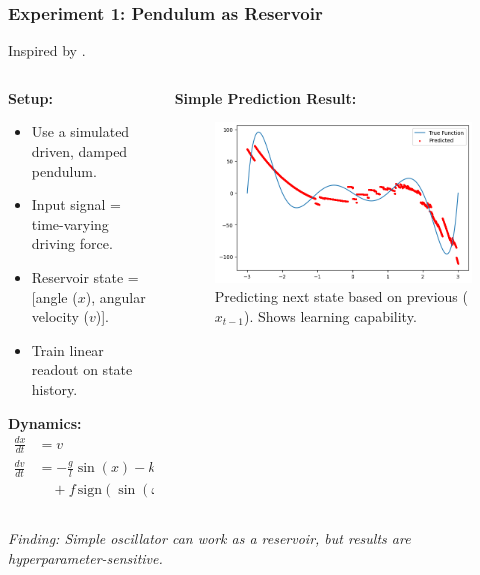 \documentclass{beamer}
\begin{document}
\begin{frame}
    \frametitle{Experiment 1: Pendulum as Reservoir}
    Inspired by \cite{Mandal2022}.
    \begin{columns}[T]
        \begin{column}{0.5\textwidth}
            \textbf{Setup:}
            \begin{itemize}
                \item Use a simulated driven, damped pendulum.
                \item Input signal = time-varying driving force.
                \item Reservoir state = [angle ($x$), angular velocity ($v$)].
                \item Train linear readout on state history.
            \end{itemize}
            \textbf{Dynamics:}
            \begin{align*}
            \frac{dx}{dt} &= v \\
            \frac{dv}{dt} &= -\frac{g}{l} \sin(x) - k v \\ & \quad + f \, \text{sign}(\sin(\omega t))
            \end{align*}
        \end{column}
        \begin{column}{0.5\textwidth}
            \textbf{Simple Prediction Result:}
            \begin{figure}
                \includegraphics[width=\linewidth]{figures/pendulum_result_0.png}
                \caption{Predicting next state based on previous ($x_{t-1}$). Shows learning capability.}
                \label{fig:pendulum-1-slide}
            \end{figure}
        \end{column}
    \end{columns}
    \textit{Finding: Simple oscillator can work as a reservoir, but results are hyperparameter-sensitive.}
\end{frame}
\end{document}

